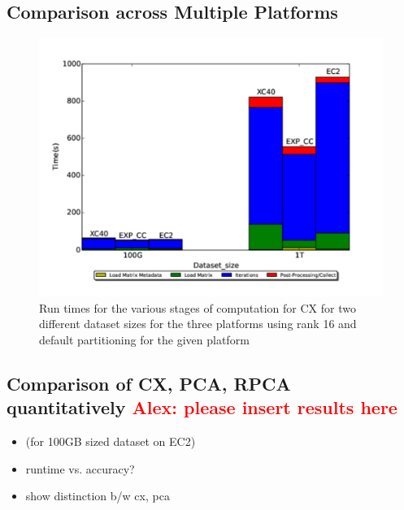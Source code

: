   \subsection{Comparison across Multiple Platforms}
  \label{sect:h2h}
    
    \begin{figure} [H]
    \begin{centering}
    \includegraphics[scale=0.4]{images/CX_Size_Scaling_Rank_16_Partitions_default.pdf}
    \end{centering}
    \caption{ Run times for the various stages of computation for CX for two different dataset sizes for the three platforms using rank 16 and default partitioning for the given platform} 
    \label{fig:h2hrank16} 
    \end{figure}

    
  

  

  \subsection{Comparison of CX, PCA, RPCA quantitatively \textcolor{red}{Alex: please insert results here} }
    \begin{itemize}
      \item (for 100GB sized dataset on EC2)
      \item runtime vs. accuracy?
      \item show distinction b/w cx, pca
    \end{itemize}

